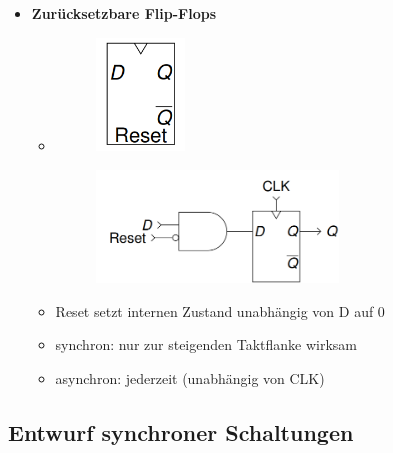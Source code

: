 \documentclass[11pt,a4paper]{article}
\begin{document}
\begin{itemize}
\item \textbf{Zurücksetzbare Flip-Flops}
	\begin{itemize}
	\item[]		
				\begin{minipage}{0.25\textwidth}
					\begin{figure}[H]
					\includegraphics[height=3cm]{Bilder/reset1}
					\end{figure}
				\end{minipage}
				\begin{minipage}[t]{0.6\textwidth}
					\vspace{-2.25cm}
					\begin{figure}[H]
					\includegraphics[height=3cm]{Bilder/reset2}
					\end{figure}
				\end{minipage}
	\end{itemize}
	\begin{itemize}
		\item Reset setzt internen Zustand unabhängig von D auf 0
		\item synchron: nur zur steigenden Taktflanke wirksam
		\item asynchron: jederzeit (unabhängig von CLK)
 	\end{itemize} 
 
\end{itemize}

 
\subsection{Entwurf synchroner Schaltungen}
\end{document}
